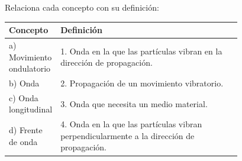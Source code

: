\begin{exercise}
    Relaciona cada concepto con su definición:
    \begin{center}
        {\small
        \begin{tabular}{@{}l p{0.78\linewidth}@{}}
            \toprule
            \textbf{Concepto} & \textbf{Definición} \\
            \midrule
            a) Movimiento ondulatorio & 1. Onda en la que las partículas vibran en la dirección de propagación. \\[3pt]
            b) Onda & 2. Propagación de un movimiento vibratorio. \\[3pt]
            c) Onda longitudinal & 3. Onda que necesita un medio material. \\[3pt]
            d) Frente de onda & 4. Onda en la que las partículas vibran perpendicularmente a la dirección de propagación. \\[3pt]

\end{tabular}}
\end{center}
\end{exercise}
